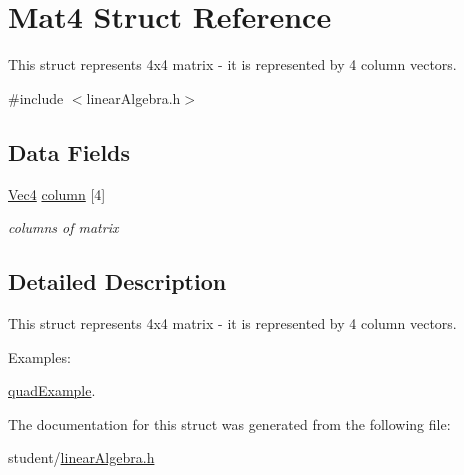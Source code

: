 \hypertarget{structMat4}{\section{Mat4 Struct Reference}
\label{structMat4}
}


This struct represents 4x4 matrix -\/ it is represented by 4 column vectors.  




{\ttfamily \#include $<$linear\-Algebra.\-h$>$}

\subsection*{Data Fields}
\begin{DoxyCompactItemize}
\item 
\hypertarget{structMat4_a89c6922a5ca3584062e9841090709592}{\hyperlink{structVec4}{Vec4} \hyperlink{structMat4_a89c6922a5ca3584062e9841090709592}{column} \mbox{[}4\mbox{]}}\label{structMat4_a89c6922a5ca3584062e9841090709592}

\begin{DoxyCompactList}\small\item\em columns of matrix \end{DoxyCompactList}\end{DoxyCompactItemize}


\subsection{Detailed Description}
This struct represents 4x4 matrix -\/ it is represented by 4 column vectors. \begin{Desc}
\item[Examples\-: ]\par
\hyperlink{quadExample-example}{quad\-Example}.\end{Desc}


The documentation for this struct was generated from the following file\-:\begin{DoxyCompactItemize}
\item 
student/\hyperlink{linearAlgebra_8h}{linear\-Algebra.\-h}\end{DoxyCompactItemize}
